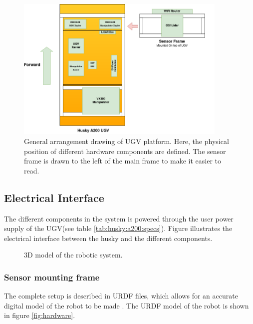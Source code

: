 \begin{figure}[H]
  \centering
   \includegraphics[width = 0.9\textwidth]{Figures/general_arrangement.drawio.png}
  \caption{General arrangement drawing of UGV platform. Here, the physical position of different hardware components are defined. The sensor frame is drawn to the left of the main frame to make it easier to read.}
  \label{fig:general_arrangement}
\end{figure}


\subsection{Electrical Interface}
The different components in the system is powered through the user power supply of the UGV(see table \ref{tab:husky:a200:specs}). Figure illustrates the electrical interface between the husky and the different components.

\begin{figure}[H]
  \centering
  
  \caption{3D model of the robotic system.}
  \label{fig:circuit_diagram}
\end{figure}


\subsubsection{Sensor mounting frame}


The complete setup is described in URDF files, which allows for an accurate digital model of the robot to be made . The URDF model of the robot is shown in figure \ref{fig:hardware}.

